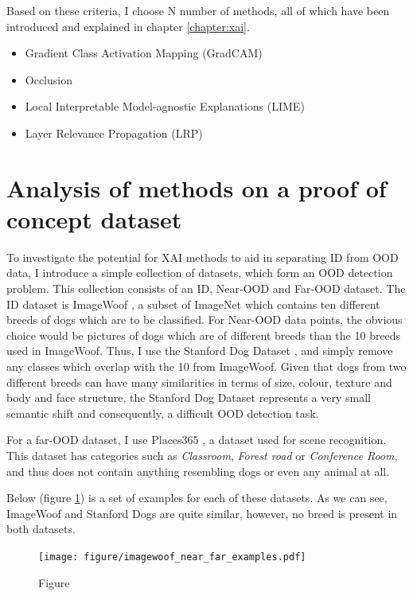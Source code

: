 \documentclass[UKenglish]{uiomasterthesis} %
\theoremstyle{definition}
\begin{document}
Based on these criteria, I choose N number of methods, all of which have been introduced and explained in chapter \ref{chapter:xai}.

\begin{itemize}
    \item Gradient Class Activation Mapping (GradCAM)
    \item Occlusion
    \item Local Interpretable Model-agnostic Explanations (LIME)
    \item Layer Relevance Propagation (LRP)
\end{itemize}

\section{Analysis of methods on a proof of concept dataset}

To investigate the potential for XAI methods to aid in separating ID from OOD data, I introduce a simple collection of datasets, which form an OOD detection problem. This collection consists of an ID, Near-OOD and Far-OOD dataset. The ID dataset is ImageWoof \cite{imagewoof}, a subset of ImageNet which contains ten different breeds of dogs which are to be classified. For Near-OOD data points, the obvious choice would be pictures of dogs which are of different breeds than the 10 breeds used in ImageWoof. Thus, I use the Stanford Dog Dataset \cite{stanforddogs}, and simply remove any classes which overlap with the 10 from ImageWoof. Given that dogs from two different breeds can have many similarities in terms of size, colour, texture and body and face structure, the Stanford Dog Dataset represents a very small semantic shift and consequently, a difficult OOD detection task.

For a far-OOD dataset, I use Places365 \cite{places365}, a dataset used for scene recognition. This dataset has categories such as {\it Classroom}, {\it Forest road} or {\it Conference Room}, and thus does not contain anything resembling dogs or even any animal at all. 

Below (figure \ref{fig:imagewoof_examples}) is a set of examples for each of these datasets. As we can see, ImageWoof and Stanford Dogs are quite similar, however, no breed is present in both datasets.

\begin{figure}[h]
\centerline{\texttt{[image: figure/imagewoof\_near\_far\_examples.pdf]}}
\caption{Figure}
\label{fig:imagewoof_examples}
\end{figure}
\end{document}
